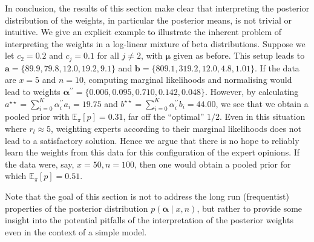 \documentclass[a4paper, notitlepage, 10pt]{article}
\begin{document}
In conclusion, the results of this section make clear that interpreting the posterior distribution of the weights, in particular the posterior means, is not trivial or intuitive.
We give an explicit example to illustrate the inherent problem of interpreting the weights in a log-linear mixture of beta distributions.
Suppose we let $c_2 = 0.2$ and $c_j = 0.1$ for all $j \neq 2$, with $\boldsymbol \mu$ given as before.
This setup leads to $\boldsymbol a = \{ 89.9, 79.8, 12.0, 19.2, 9.1\}$ and $\boldsymbol b = \{809.1, 319.2, 12.0, 4.8, 1.01\} $.
If the data are $x = 5$ and $n = 10$, computing marginal likelihoods and normalising would lead to weights $\boldsymbol\alpha^{\prime\prime} = \{0.006, 0.095, 0.710, 0.142, 0.048\}$.
However, by calculating $a^{\star\star} = \sum_{i = 0}^K \alpha_i^{\prime\prime} a_i = 19.75$ and $b^{\star\star} =  \sum_{i = 0}^K \alpha_i^{\prime\prime} b_i = 44.00$, we see that we obtain a pooled prior with $\mathbb{E}_\pi [p] =  0.31$, far off the ``optimal'' $1/2$.
Even in this situation where $r_l \approx 5$, weighting experts according to their marginal likelihoods does not lead to a satisfactory solution.
Hence we argue that there is no hope to reliably learn the weights from this data for this configuration of the expert opinions.
If the data were, say, $x = 50, n = 100$, then one would obtain a pooled prior for which $\mathbb{E}_\pi [p] = 0.51$.

Note that the goal of this section is not to address the long run (frequentist) properties of the posterior distribution $p(\boldsymbol{\alpha} \mid x, n)$, but rather to provide some insight into the potential pitfalls of the interpretation of the posterior weights even in the context of  a simple model.
\end{document}

